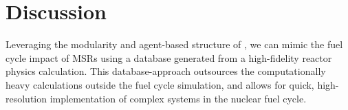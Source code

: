 \section{Discussion}

Leveraging the modularity and agent-based structure of \Cyclus,
we can mimic the fuel cycle impact of \glspl{MSR} using a database
generated from a high-fidelity reactor physics calculation.
This database-approach outsources the computationally heavy
calculations outside the fuel cycle simulation, and allows
for quick, high-resolution implementation of complex systems
in the nuclear fuel cycle.